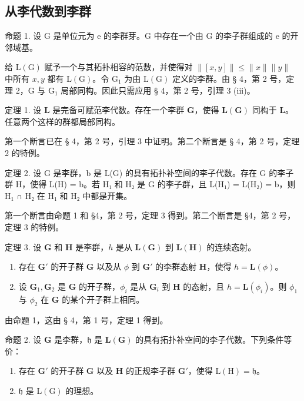 \subsection{从李代数到李群}

命题 1. 设 G 是单位元为 e 的李群芽。G 中存在一个由 G 的李子群组成的 e 的开邻域基。

给 \(\mathrm{L}(\mathrm{G})\) 赋予一个与其拓扑相容的范数，并使得对 \(\| [x,y]\| \leqslant \| x\| \| y\|\) 中所有 \(x,y\) 都有 \(\mathrm{L}(\mathrm{G})\)。令 \(\mathrm{G}_1\) 为由 \(\mathrm{L}(\mathrm{G})\) 定义的李群。由 § 4，第 2 号，定理 2，G 与 \(\mathrm{G}_1\) 局部同构。因此只需应用 § 4，第 2 号，引理 3 (iii)。

定理 1. 设 \(\mathbf{L}\) 是完备可赋范李代数。存在一个李群 \(\mathbf{G}\)，使得 \(\mathbf{L}(\mathbf{G})\) 同构于 \(\mathbf{L}\)。任意两个这样的群都局部同构。

第一个断言已在 § 4，第 2 号，引理 3 中证明。第二个断言是 § 4，第 2 号，定理 2 的特例。

定理 2. 设 G 是李群，b 是 L(G) 的具有拓扑补空间的李子代数。存在 G 的李子群 H，使得 L(H) = b。若 H₁ 和 H₂ 是 G 的李子群，且 L(H₁) = L(H₂) = b，则 H₁ ∩ H₂ 在 H₁ 和 H₂ 中都是开集。

第一个断言由命题 1 和 §4，第 2 号，定理 3 得到。第二个断言是 §4，第 2 号，定理 3 的特例。

定理 3. 设 \(\mathbf{G}\) 和 \(\mathbf{H}\) 是李群，\(h\) 是从 \(\mathbf{L}(\mathbf{G})\) 到 \(\mathbf{L}(\mathbf{H})\) 的连续态射。

\begin{enumerate}
\def\labelenumi{(\roman{enumi})}
\item
  存在 \(\mathbf{G}'\) 的开子群 \(\mathbf{G}\) 以及从 \(\phi\) 到 \(\mathbf{G}'\) 的李群态射 \(\mathbf{H}\)，使得 \(h = \mathbf{L}(\phi)\)。
\item
  设 \(\mathbf{G}_1, \mathbf{G}_2\) 是 \(\mathbf{G}\) 的开子群，\(\phi_i\) 是从 \(\mathbf{G}_i\) 到 \(\mathbf{H}\) 的态射，且 \(h = \mathbf{L}(\phi_i)\)。则 \(\phi_1\) 与 \(\phi_2\) 在 \(\mathbf{G}\) 的某个开子群上相同。
\end{enumerate}

由命题 1，这由 § 4，第 1 号，定理 1 得到。

命题 2. 设 \(\mathbf{G}\) 是李群，\(\mathfrak{h}\) 是 \(\mathbf{L}(\mathbf{G})\) 的具有拓扑补空间的李子代数。下列条件等价：

\begin{enumerate}
\def\labelenumi{(\roman{enumi})}
\item
  存在 \(\mathbf{G}'\) 的开子群 \(\mathbf{G}\) 以及 \(\mathbf{H}\) 的正规李子群 \(\mathbf{G}'\)，使得 \(\mathrm{L(H)} = \mathfrak{h}\)。
\item
  \(\mathfrak{h}\) 是 \(\mathrm{L}(\mathrm{G})\) 的理想。
\end{enumerate}

